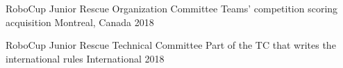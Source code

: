 
\begin{cvhonors}
  \cvhonor
    {RoboCup Junior Rescue Organization Committee} %
    {Teams' competition scoring acquisition} %
    {Montreal, Canada} %
    {2018} %

  \cvhonor
    {RoboCup Junior Rescue Technical Committee} %
    {Part of the TC that writes the international rules} %
    {International} %
    {2018} %

\begin{comment}
  \cvhonor
    {RoboCup Junior Rescue Organization Committee} %
    {Design of competition fields, team interviews} %
    {Magdeburg, Germany} %
    {2017} %
\end{comment}
\end{cvhonors}
